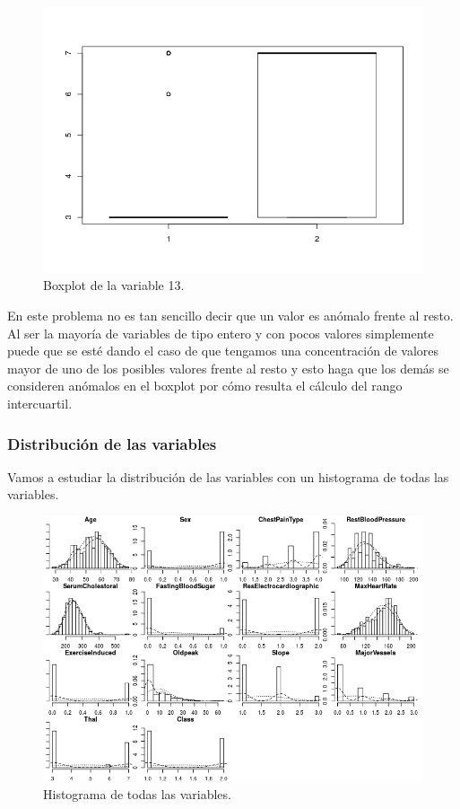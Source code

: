 \documentclass[12pt,a4paper]{article}
\begin{document}
\begin{figure}[H]
	\centering
	\includegraphics[scale=0.6]{./Imagenes/EDA/Clasificacion/boxplot_variable13.png}
	\caption{Boxplot de la variable 13.}
\end{figure}

En este problema no es tan sencillo decir que un valor es anómalo frente al resto. Al ser la mayoría de variables de tipo entero y con pocos valores simplemente puede que se esté dando el caso de que tengamos una concentración de valores mayor de uno de los posibles valores frente al resto y esto haga que los demás se consideren anómalos en el boxplot por cómo resulta el cálculo del rango intercuartil.

\subsubsection{Distribución de las variables}

Vamos a estudiar la distribución de las variables con un histograma de todas las variables.

\begin{figure}[H]
	\centering
	\includegraphics[scale=0.9]{./Imagenes/EDA/Clasificacion/histograma_todas.png}
	\caption{Histograma de todas las variables.}
\end{figure}
\end{document}
